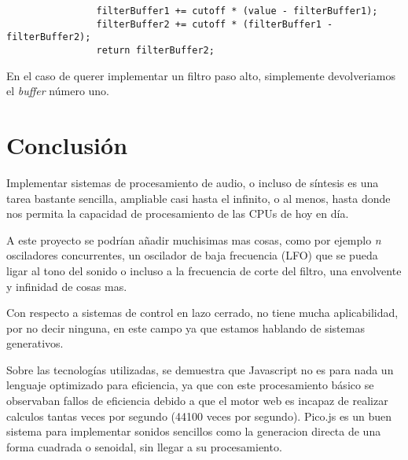 \documentclass[a4paper]{article}
\begin{document}
                \begin{verbatim}
                filterBuffer1 += cutoff * (value - filterBuffer1);
                filterBuffer2 += cutoff * (filterBuffer1 - filterBuffer2);
                return filterBuffer2;
                \end{verbatim}

                En el caso de querer implementar un filtro
                paso alto, simplemente devolveriamos el
                \textit{buffer} número uno.
                \newpage

        \section{Conclusión}
            Implementar sistemas de procesamiento de audio, o incluso
            de síntesis es una tarea bastante sencilla, ampliable casi
            hasta el infinito, o al menos, hasta donde nos permita
            la capacidad de procesamiento de las CPUs de hoy en día.

            A este proyecto se podrían añadir muchisimas mas cosas, como
            por ejemplo \textit{n} osciladores concurrentes, un oscilador
            de baja frecuencia (LFO) que se pueda ligar al tono del sonido
            o incluso a la frecuencia de corte del filtro, una envolvente
            y infinidad de cosas mas.

            Con respecto a sistemas de control en lazo cerrado, no tiene
            mucha aplicabilidad, por no decir ninguna, en este campo ya
            que estamos hablando de sistemas generativos.

            Sobre las tecnologías utilizadas, se demuestra que Javascript
            no es para nada un lenguaje optimizado para eficiencia, ya
            que con este procesamiento básico se observaban fallos de
            eficiencia debido a que el motor web es incapaz de realizar
            calculos tantas veces por segundo (44100 veces por segundo).
            Pico.js es un buen sistema para implementar sonidos sencillos
            como la generacion directa de una forma cuadrada o senoidal,
            sin llegar a su procesamiento.
\end{document}
